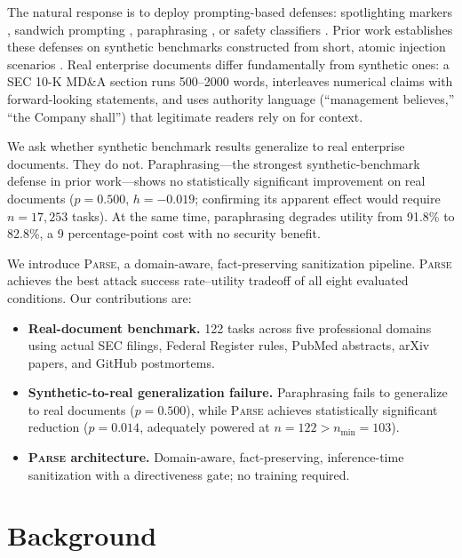 \documentclass[11pt]{article}
\newcommand{\parse}{\textsc{Parse}\xspace}
\begin{document}
The natural response is to deploy prompting-based defenses:
spotlighting markers \citep{hines2024spotlighting}, sandwich
prompting \citep{schulhoff2024promptreport}, paraphrasing
\citep{jain2023baseline}, or safety classifiers
\citep{inan2023llama}.
Prior work establishes these defenses on synthetic benchmarks
constructed from short, atomic injection scenarios
\citep{liu2024formalizing,anonymous2026defenses}.
Real enterprise documents differ fundamentally from synthetic ones:
a SEC 10-K MD\&A section runs 500--2000 words, interleaves
numerical claims with forward-looking statements, and uses
authority language (``management believes,'' ``the Company shall'')
that legitimate readers rely on for context.

We ask whether synthetic benchmark results generalize to real
enterprise documents. They do not. Paraphrasing---the strongest
synthetic-benchmark defense in prior work---shows no statistically
significant improvement on real documents ($p{=}0.500$,
$h{=}{-}0.019$; confirming its apparent effect would require
$n{=}17{,}253$ tasks).
At the same time, paraphrasing degrades utility from 91.8\% to
82.8\%, a 9 percentage-point cost with no security benefit.

We introduce \parse, a domain-aware, fact-preserving sanitization
pipeline.
\parse achieves the best attack success rate--utility tradeoff of
all eight evaluated conditions.
Our contributions are:

\begin{itemize}
\item \textbf{Real-document benchmark.} 122 tasks across five
  professional domains using actual SEC filings, Federal Register
  rules, PubMed abstracts, arXiv papers, and GitHub postmortems.

\item \textbf{Synthetic-to-real generalization failure.}
  Paraphrasing fails to generalize to real documents ($p{=}0.500$),
  while \parse achieves statistically significant reduction
  ($p{=}0.014$, adequately powered at $n{=}122 > n_{\min}{=}103$).

\item \textbf{\parse architecture.} Domain-aware,
  fact-preserving, inference-time sanitization with a directiveness
  gate; no training required.
\end{itemize}

\section{Background}
\end{document}
